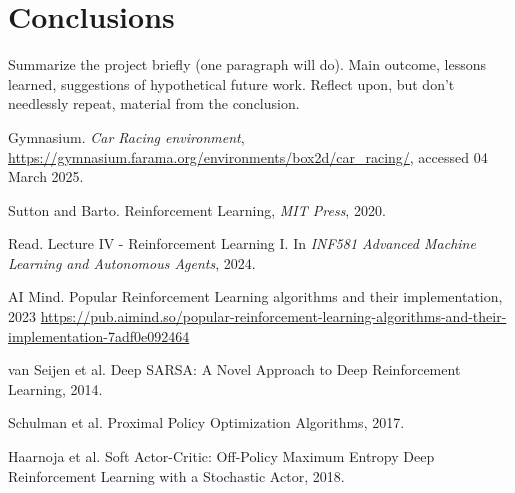 \documentclass[../CSC_52081_EP.tex]{subfiles}
\begin{document}
    \section{Conclusions}
        Summarize the project briefly (one paragraph will do). Main outcome, lessons learned, suggestions of hypothetical future work.
        Reflect upon, but don't needlessly repeat, material from the conclusion.

    \begin{thebibliography}{4}
            Gymnasium. \textit{Car Racing environment}, \url{https://gymnasium.farama.org/environments/box2d/car_racing/}, accessed 04 March 2025.

        Sutton and Barto. Reinforcement Learning,
        {\em MIT Press}, 2020.

            Read. Lecture IV - Reinforcement Learning I. In \textit{INF581 Advanced Machine Learning and Autonomous Agents}, 2024.

            AI Mind. Popular Reinforcement Learning algorithms and their implementation, 2023 \url{https://pub.aimind.so/popular-reinforcement-learning-algorithms-and-their-implementation-7adf0e092464}
        
            van Seijen et al. Deep SARSA: A Novel Approach to Deep Reinforcement Learning, 2014.
        
            Schulman et al. Proximal Policy Optimization Algorithms, 2017.

            Haarnoja et al. Soft Actor-Critic: Off-Policy Maximum Entropy Deep Reinforcement Learning with a Stochastic Actor, 2018.

        \end{thebibliography}
\end{document}
